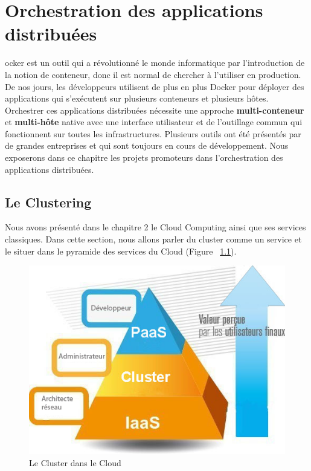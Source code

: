 \chapter{Orchestration des applications distribuées}
\begin{onehalfspace}

ocker est un outil qui a révolutionné le monde informatique par l'introduction de la notion de conteneur, donc il est normal de chercher à l'utiliser en production. De nos jours, les développeurs utilisent de plus en plus Docker pour déployer des applications qui s’exécutent sur plusieurs conteneurs et plusieurs hôtes. Orchestrer ces applications distribuées nécessite une approche \textbf{multi-conteneur} et \textbf{multi-hôte} native avec une interface utilisateur et de l'outillage commun qui fonctionnent sur toutes les infrastructures. Plusieurs outils ont été présentés par de grandes entreprises et qui sont toujours en cours de développement. Nous exposerons dans ce chapitre les projets promoteurs dans l'orchestration des applications distribuées.

\newpage

\section{Le Clustering}

Nous avons présenté dans le chapitre 2 le Cloud Computing ainsi que ses services classiques. Dans cette section, nous allons parler du cluster comme un service et le situer dans le pyramide des services du Cloud (Figure ~\ref{fig:pyramide-cluster}).

\begin{figure}[H]
\centering
\includegraphics [scale=0.7]{chapitre3/assets/pyramide}
\caption{Le Cluster dans le Cloud}
\label{fig:pyramide-cluster}
\end{figure}


\end{onehalfspace}

